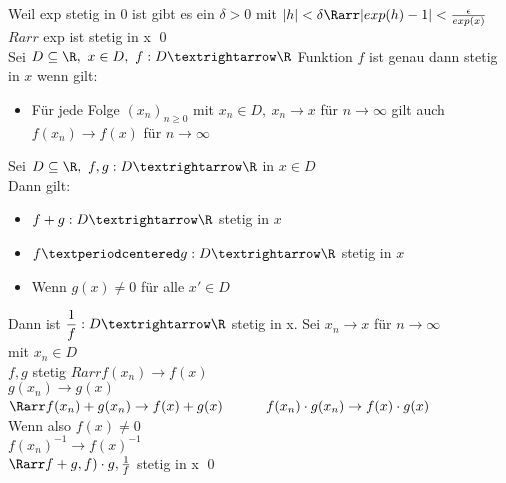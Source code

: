Weil exp stetig in 0 ist gibt es ein $\delta > 0$ mit $|h| < \delta \Rarr |exp(h) -1| < \frac{\epsilon}{exp(x)}$\\
$Rarr$ exp ist stetig in x \qed\\
%
Sei $D\subseteq\R,\ x\in D,\ f:D→\R$ Funktion $f$ ist genau dann stetig in $x$ wenn gilt:\\
\begin{itemize}
\item{Für jede Folge $(x_n)_{n\geq 0}$ mit $x_n\in D,\ x_n→x$ für $n→∞$ gilt auch $f(x_n)→f(x)$ für $n→∞$}
\end{itemize}
%
Sei $D\subseteq\R,\ f,g:D→\R$ in $x\in D$\\
Dann gilt:\\
\begin{itemize}
\item{$f+g:D→\R$ stetig in $x$}
\item{$f·g:D→\R$ stetig in $x$}
\item{Wenn $g(x)\neq 0$ für alle $x'\in D$}
\end{itemize}
Dann ist $\dfrac{1}{f}:D→\R$ stetig in x.
Sei $x_n \to x$ für $n \to \infty$\\
mit $x_n \in D$\\
$f, g$ stetig $Rarr f(x_n) \to f(x)$ \\
\phantom{$f, g$ stetig $Rarr$} $g(x_n) \to g(x)$\\
$\Rarr f(x_n) + g(x_n) \to f(x) + g(x)$
$\phantom{\Rarr} f(x_n) \cdot g(x_n) \to f(x) \cdot g(x)$\\
Wenn also $f(x) \neq 0$\\
$f(x_n)^{-1} \to f(x)^{-1}$\\
$\Rarr f + g, f) \cdot g, \frac{1}{f}$ stetig in x \qed